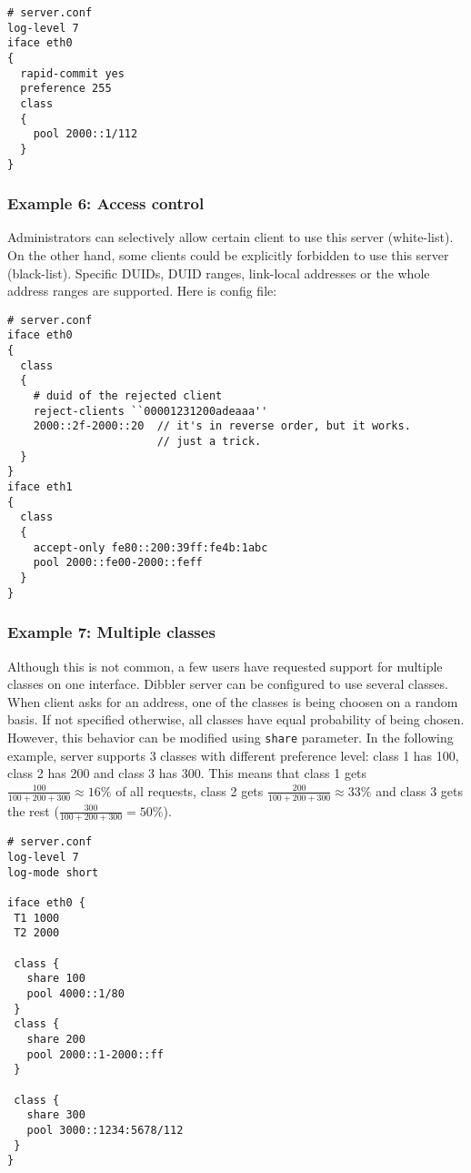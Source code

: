 \begin{lstlisting}
# server.conf
log-level 7
iface eth0
{
  rapid-commit yes
  preference 255
  class
  {
    pool 2000::1/112
  }
}  
\end{lstlisting}

\subsubsection{Example 6: Access control}
Administrators can selectively allow certain client to use this
server (white-list). On the other hand, some clients could be
explicitly forbidden to use this server (black-list). Specific DUIDs,
DUID ranges, link-local addresses or the whole address ranges are
supported. Here is config file:

\begin{lstlisting}
# server.conf
iface eth0
{
  class
  {
    # duid of the rejected client
    reject-clients ``00001231200adeaaa''
    2000::2f-2000::20  // it's in reverse order, but it works.
                       // just a trick. 
  }
}
iface eth1
{
  class
  {
    accept-only fe80::200:39ff:fe4b:1abc
    pool 2000::fe00-2000::feff
  }
}
\end{lstlisting}

\subsubsection{Example 7: Multiple classes}
Although this is not common, a few users have requested support for multiple classes on one interface.
Dibbler server can be configured to use several classes. When client asks for an address, one of the classes
is being choosen on a random basis. If not specified otherwise, all classes have equal probability of being chosen.
However, this behavior can be modified using \verb+share+ parameter. In the following example, server supports
3 classes with different preference level: class 1 has 100, class 2 has 200 and class 3 has 300. This means that class 1
gets $\frac{100}{100+200+300} \approx 16\% $ of all requests, class 2
gets $\frac{200}{100+200+300} \approx 33\% $ and class 3 gets the rest 
($\frac{300}{100+200+300}=50\% $).

\begin{lstlisting}
# server.conf
log-level 7
log-mode short

iface eth0 {
 T1 1000
 T2 2000

 class {
   share 100
   pool 4000::1/80
 }
 class {
   share 200
   pool 2000::1-2000::ff
 }

 class {
   share 300
   pool 3000::1234:5678/112
 }
}
\end{lstlisting}

